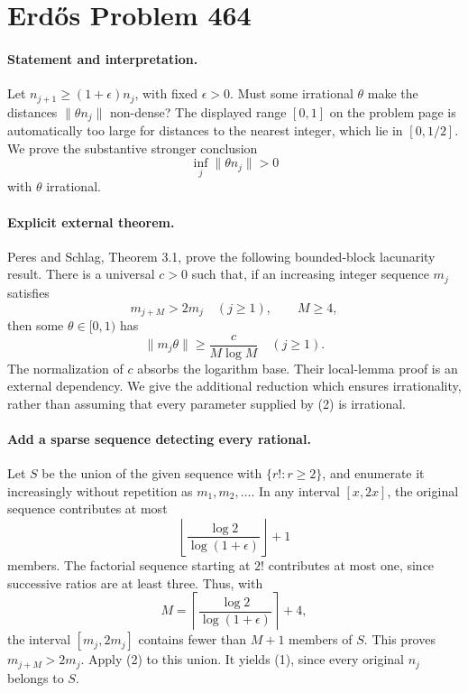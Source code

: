 \section*{Erd\H{o}s Problem 464}

\paragraph{Statement and interpretation.}
Let \(n_{j+1}\geq(1+\epsilon)n_j\), with fixed \(\epsilon>0\).
Must some irrational \(\theta\) make the distances
\(\|\theta n_j\|\) non-dense? The displayed range \([0,1]\) on the
problem page is automatically too large for distances to the nearest
integer, which lie in \([0,1/2]\). We prove the substantive stronger
conclusion
\[
 \inf_j\|\theta n_j\|>0
 \tag{1}
\]
with \(\theta\) irrational.

\paragraph{Explicit external theorem.}
Peres and Schlag, Theorem 3.1, prove the following bounded-block
lacunarity result. There is a universal \(c>0\) such that, if an
increasing integer sequence \(m_j\) satisfies
\[
 m_{j+M}>2m_j\quad(j\geq1),\qquad M\geq4,
\]
then some \(\theta\in[0,1)\) has
\[
 \|m_j\theta\|\geq \frac{c}{M\log M}\quad(j\geq1).
 \tag{2}
\]
The normalization of \(c\) absorbs the logarithm base.
Their local-lemma proof is an external dependency. We give the
additional reduction which ensures irrationality, rather than assuming
that every parameter supplied by (2) is irrational.

\paragraph{Add a sparse sequence detecting every rational.}
Let \(S\) be the union of the given sequence with
\(\{r!:r\geq2\}\), and enumerate it increasingly without repetition
as \(m_1,m_2,\ldots\).
In any interval \([x,2x]\), the original sequence contributes at most
\[
 \left\lfloor\frac{\log2}{\log(1+\epsilon)}\right\rfloor+1
\]
members. The factorial sequence starting at \(2!\) contributes at
most one, since successive ratios are at least three.
Thus, with
\[
 M=\left\lceil\frac{\log2}{\log(1+\epsilon)}\right\rceil+4,
\]
the interval \([m_j,2m_j]\) contains fewer than \(M+1\) members of
\(S\). This proves \(m_{j+M}>2m_j\).
Apply (2) to this union. It yields (1), since every original \(n_j\)
belongs to \(S\).

